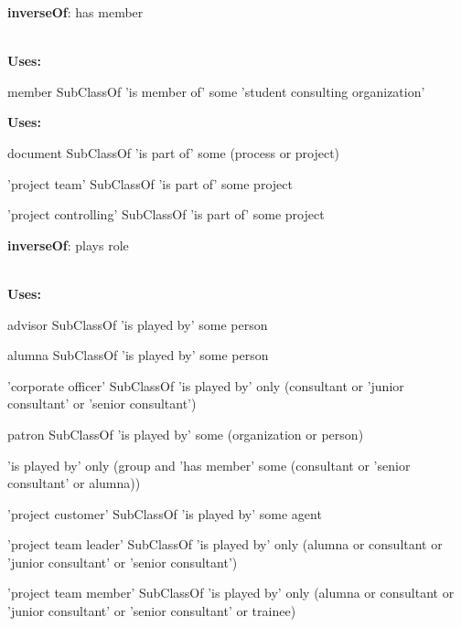 \documentclass[a4paper, DIV=13, BCOR=0cm]{scrbook}
\begin{document}
\begin{mdframed}[style=onto, frametitle={is member of}]
	{%
		\begin{compactitem}
			\item \textbf{inverseOf}: has member
		\end{compactitem}
		\hrulefill\\
		\textbf{Uses:}
		\begin{compactitem}
			\item member SubClassOf 'is member of' some 'student consulting organization'
		\end{compactitem}
	} %
\end{mdframed}

\begin{mdframed}[style=onto, frametitle={is part of}]
	{%
		\textbf{Uses:}
		\begin{compactitem}
			\item document SubClassOf 'is part of' some 
			(process or project)
			\item 'project team' SubClassOf 'is part of' some project
			\item 'project controlling' SubClassOf 'is part of' some project
		\end{compactitem}
	} %
\end{mdframed}

\begin{mdframed}[style=onto, frametitle={is played by}]
	{%
		\begin{compactitem}
			\item \textbf{inverseOf}: plays role
		\end{compactitem}
		\hrulefill\\
		\textbf{Uses:}
		\begin{compactitem}
			\item advisor SubClassOf 'is played by' some person
			\item alumna SubClassOf 'is played by' some person
			\item 'corporate officer' SubClassOf 'is played by' only 
			(consultant or 'junior consultant' or 'senior consultant')
			\item patron SubClassOf 'is played by' some 
			(organization or person)
			\item 'is played by' only (group and 'has member' some (consultant or 'senior consultant' or alumna))
			\item 'project customer' SubClassOf 'is played by' some agent
			\item 'project team leader' SubClassOf 'is played by' only 
			(alumna or consultant or 'junior consultant' or 'senior consultant')
			\item 'project team member' SubClassOf 'is played by' only 
			(alumna or consultant or 'junior consultant' or 'senior consultant' or trainee)
		\end{compactitem}
	} %
\end{mdframed}
\end{document}
